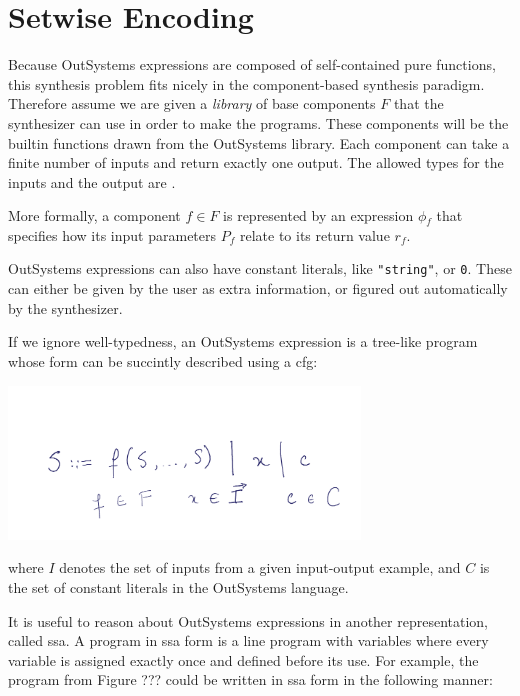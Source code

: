 \section{Setwise Encoding}
\label{sec:setwise-encoding}

Because OutSystems expressions are composed of self-contained pure functions,
this synthesis problem fits nicely in the component-based synthesis paradigm.
Therefore assume we are given a \textit{library} of base components $F$ that the
synthesizer can use in order to make the programs. These components will be the
builtin functions drawn from the OutSystems library. Each component can take a
finite number of inputs and return exactly one output. The allowed types for the
inputs and the output are .

More formally, a component $f \in F$ is represented by an expression
$\phi{}_f$ that specifies how its input parameters $P_f$ relate to its
return value $r_f$.


OutSystems expressions can also have constant literals, like
\lstinline{"string"}, or \lstinline{0}. These can either be given by the user as
extra information, or figured out automatically by the synthesizer.

If we ignore well-typedness, an OutSystems expression is a tree-like program
whose form can be succintly described using a \gls{cfg}:

\begin{center}
  \includegraphics[width=0.7\textwidth]{assets/cfg-expressions.png}
\end{center}


where $I$ denotes the set of inputs from a given input-output example, and
$C$ is the set of constant literals in the OutSystems language.

It is useful to reason about OutSystems expressions in another representation,
called \gls{ssa}. A program in \gls{ssa} form is a line program with variables
where every variable is assigned exactly once and defined before its use. For
example, the program from Figure ??? could be written in \gls{ssa} form in the
following manner:

